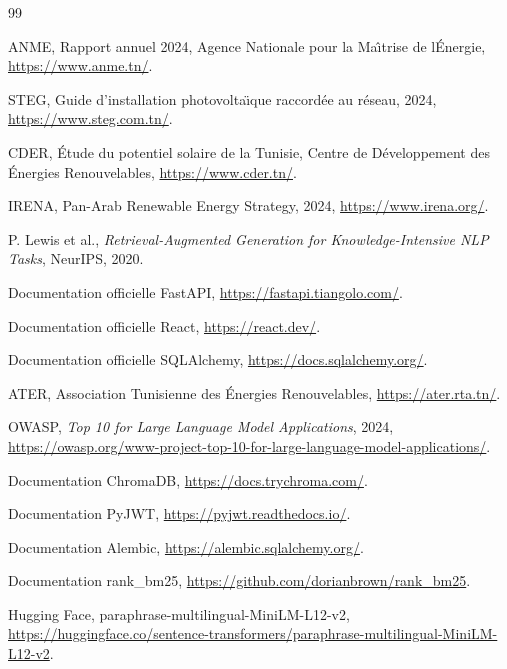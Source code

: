 \documentclass[12pt,a4paper,oneside]{report}
\begin{document}
\begin{thebibliography}{99}

 ANME, Rapport annuel 2024, Agence Nationale pour la Ma\^{\i}trise de l\'{E}nergie, \url{https://www.anme.tn/}.

 STEG, Guide d'installation photovolta\"{\i}que raccord\'{e}e au r\'{e}seau, 2024, \url{https://www.steg.com.tn/}.

 CDER, \'{E}tude du potentiel solaire de la Tunisie, Centre de D\'{e}veloppement des \'{E}nergies Renouvelables, \url{https://www.cder.tn/}.

 IRENA, Pan-Arab Renewable Energy Strategy, 2024, \url{https://www.irena.org/}.

 P. Lewis et al., \textit{Retrieval-Augmented Generation for Knowledge-Intensive NLP Tasks}, NeurIPS, 2020.

 Documentation officielle FastAPI, \url{https://fastapi.tiangolo.com/}.

 Documentation officielle React, \url{https://react.dev/}.

 Documentation officielle SQLAlchemy, \url{https://docs.sqlalchemy.org/}.

 ATER, Association Tunisienne des \'{E}nergies Renouvelables, \url{https://ater.rta.tn/}.

 OWASP, \textit{Top 10 for Large Language Model Applications}, 2024, \url{https://owasp.org/www-project-top-10-for-large-language-model-applications/}.

 Documentation ChromaDB, \url{https://docs.trychroma.com/}.

 Documentation PyJWT, \url{https://pyjwt.readthedocs.io/}.

 Documentation Alembic, \url{https://alembic.sqlalchemy.org/}.

 Documentation rank\_bm25, \url{https://github.com/dorianbrown/rank_bm25}.

 Hugging Face, paraphrase-multilingual-MiniLM-L12-v2, \url{https://huggingface.co/sentence-transformers/paraphrase-multilingual-MiniLM-L12-v2}.

\end{thebibliography}
\end{document}
